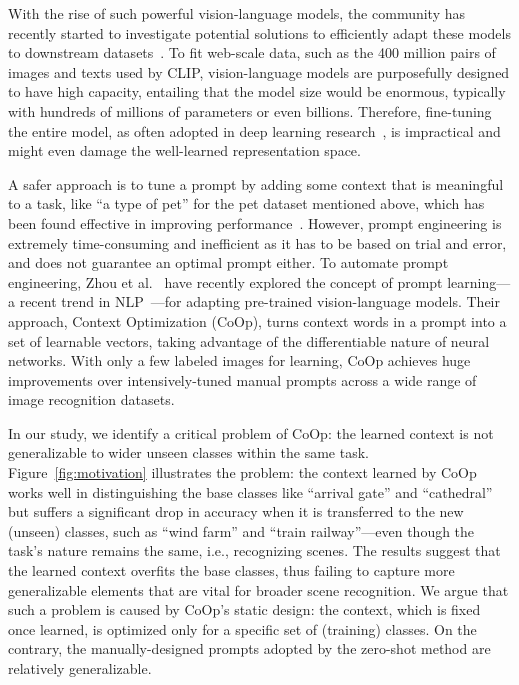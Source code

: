 \documentclass[10pt,twocolumn,letterpaper]{article}
\begin{document}
With the rise of such powerful vision-language models, the community has recently started to investigate potential solutions to efficiently adapt these models to downstream datasets~\cite{zhou2021coop,yao2021cpt,gao2021clip,wortsman2021robust}. To fit web-scale data, such as the 400 million pairs of images and texts used by CLIP, vision-language models are purposefully designed to have high capacity, entailing that the model size would be enormous, typically with hundreds of millions of parameters or even billions. Therefore, fine-tuning the entire model, as often adopted in deep learning research~\cite{he2016deep}, is impractical and might even damage the well-learned representation space.

A safer approach is to tune a prompt by adding some context that is meaningful to a task, like ``a type of pet'' for the pet dataset mentioned above, which has been found effective in improving performance~\cite{radford2021learning}. However, prompt engineering is extremely time-consuming and inefficient as it has to be based on trial and error, and does not guarantee an optimal prompt either. To automate prompt engineering, Zhou et al.~\cite{zhou2021coop} have recently explored the concept of prompt learning---a recent trend in NLP~\cite{shin2020autoprompt,jiang2020can,li2021prefix,zhong2021factual,lester2021power,gao2020making}---for adapting pre-trained vision-language models. Their approach, Context Optimization (CoOp), turns context words in a prompt into a set of learnable vectors, taking advantage of the differentiable nature of neural networks. With only a few labeled images for learning, CoOp achieves huge improvements over intensively-tuned manual prompts across a wide range of image recognition datasets.

In our study, we identify a critical problem of CoOp: the learned context is not generalizable to wider unseen classes within the same task. Figure~\ref{fig:motivation} illustrates the problem: the context learned by CoOp works well in distinguishing the base classes like ``arrival gate'' and ``cathedral'' but suffers a significant drop in accuracy when it is transferred to the new (unseen) classes, such as ``wind farm'' and ``train railway''---even though the task's nature remains the same, i.e., recognizing scenes. The results suggest that the learned context overfits the base classes, thus failing to capture more generalizable elements that are vital for broader scene recognition. We argue that such a problem is caused by CoOp's static design: the context, which is fixed once learned, is optimized only for a specific set of (training) classes. On the contrary, the manually-designed prompts adopted by the zero-shot method are relatively generalizable.
\end{document}

